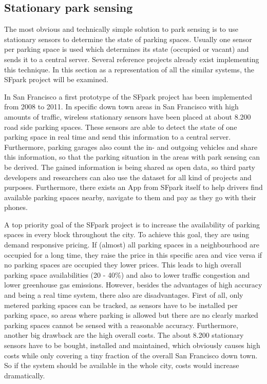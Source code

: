 \subsection{Stationary park sensing}
\label{sec:stationary_park_sensing}

The most obvious and technically simple solution to park sensing is to use stationary sensors to determine the state of parking spaces. Usually one sensor per parking space is used which determines its state (occupied or vacant) and sends it to a central server. Several reference projects already exist \cite{SFPark, VehicleSense} implementing this technique. In this section as a representation of all the similar systems, the SFpark project will be examined.

In San Francisco a first prototype of the SFpark project \cite{SFPark} has been implemented from 2008 to 2011. In specific down town areas in San Francisco with high amounts of traffic, wireless stationary sensors have been placed at about 8.200 road side parking spaces. These sensors are able to detect the state of one parking space in real time and send this information to a central server. Furthermore, parking garages also count the in- and outgoing vehicles and share this information, so that the parking situation in the areas with park sensing can be derived. The gained information is being shared as open data, so third party developers and researchers can also use the dataset for all kind of projects and purposes. Furthermore, there exists an App from SFpark itself to help drivers find available parking spaces nearby, navigate to them and pay as they go with their phones.

A top priority goal of the SFpark project is to increase the availability of parking spaces in every block throughout the city. To achieve this goal, they are using demand responsive pricing. If (almost) all parking spaces in a neighbourhood are occupied for a long time, they raise the price in this specific area and vice versa if no parking spaces are occupied they lower prices. This leads to high overall parking space availabilities (20 - 40\%) and also to lower traffic congestion and lower greenhouse gas emissions. However, besides the advantages of high accuracy and being a real time system, there also are disadvantages. First of all, only metered parking spaces can be tracked, as sensors have to be installed per parking space, so areas where parking is allowed but there are no clearly marked parking spaces cannot be sensed with a reasonable accuracy. Furthermore, another big drawback are the high overall costs. The about 8.200 stationary sensors have to be bought, installed and maintained, which obviously causes high costs while only covering a tiny fraction of the overall San Francisco down town. So if the system should be available in the whole city, costs would increase dramatically.

